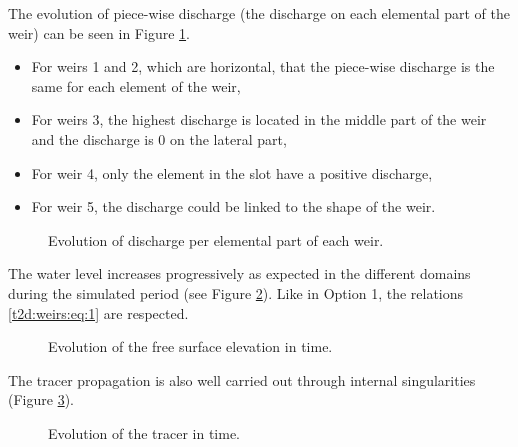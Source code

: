 The evolution of piece-wise discharge (the discharge on each elemental part of
the weir) can be seen in Figure \ref{t2d:weirs2:fig:weirsdischarge}.

\begin{itemize}
\item For weirs 1 and 2, which are horizontal, that the piece-wise discharge is
  the same for each element of the weir,
\item For weirs 3, the highest discharge is located in the middle part of the
  weir and the discharge is 0 on the lateral part,
\item For weir 4, only the element in the slot have a positive discharge,
\item For weir 5, the discharge could be linked to the shape of the weir.
\end{itemize}

\begin{figure}[!htbp]
 \hfill 
 \hfill
 \centering
 \caption{Evolution of discharge per elemental part of each weir.}
 \label{t2d:weirs2:fig:weirsdischarge}
\end{figure}

The water level increases progressively as expected
in the different domains during the simulated period
(see Figure \ref{t2d:weirs2:fig:z}).
Like in Option 1, the relations \eqref{t2d:weirs:eq:1} are respected.

\begin{figure}[H]
 \centering
 \caption{Evolution of the free surface elevation in time.}
 \label{t2d:weirs2:fig:z}
\end{figure}

The tracer propagation is also well carried out through internal singularities
 (Figure \ref{t2d:weirs2:fig:tracer}).

\begin{figure}[H]
 \centering
 \caption{Evolution of the tracer in time.}
 \label{t2d:weirs2:fig:tracer}
\end{figure}

